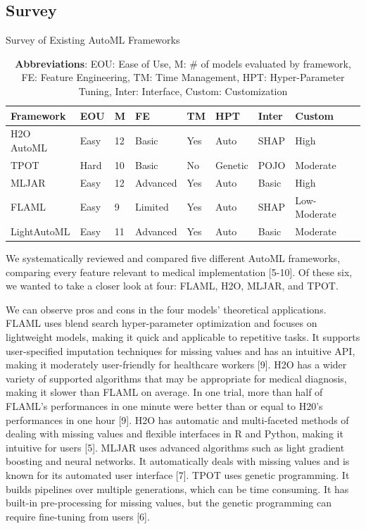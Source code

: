 \documentclass{article}
\begin{document}
\subsection{Survey}

\begin{table}
  \caption{Survey of Existing AutoML Frameworks}
  \label{automl-survey}
  \centering
  \begin{tabular}{lllllllll}
    \toprule
    Framework & EOU & M & FE & TM & HPT & Inter & Custom\\
    \midrule
    H2O AutoML & Easy & 12 & Basic & Yes & Auto & SHAP & High\\
    TPOT & Hard & 10 & Basic & No & Genetic & POJO & Moderate\\
    MLJAR & Easy & 12 & Advanced & Yes & Auto & Basic & High\\
    FLAML & Easy & 9 & Limited & Yes & Auto & SHAP & Low-Moderate\\
    LightAutoML & Easy & 11 & Advanced & Yes & Auto & Basic & Moderate\\
    \bottomrule
  \end{tabular}
  \captionsetup{font=footnotesize}
  \caption*{\textbf{Abbreviations}: EOU: Ease of Use, M: \# of models evaluated by framework, FE: Feature Engineering, TM: Time Management, HPT: Hyper-Parameter Tuning, Inter: Interface, Custom: Customization}
\end{table}
We systematically reviewed and compared five different AutoML frameworks, comparing every feature relevant to medical implementation [5-10]. Of these six, we wanted to take a closer look at four: FLAML, H2O, MLJAR, and TPOT.

We can observe pros and cons in the four models' theoretical applications. FLAML uses blend search hyper-parameter optimization and focuses on lightweight models, making it quick and applicable to repetitive tasks. It supports user-specified imputation techniques for missing values and has an intuitive API, making it moderately user-friendly for healthcare workers [9]. H2O has a wider variety of supported algorithms that may be appropriate for medical diagnosis, making it slower than FLAML on average. In one trial, more than half of FLAML's performances in one minute were better than or equal to H20's performances in one hour [9]. H2O has automatic and multi-faceted methods of dealing with missing values and flexible interfaces in R and Python, making it intuitive for users [5]. MLJAR uses advanced algorithms such as light gradient boosting and neural networks. It automatically deals with missing values and is known for its automated user interface [7]. TPOT uses genetic programming. It builds pipelines over multiple generations, which can be time consuming. It has built-in pre-processing for missing values, but the genetic programming can require fine-tuning from users [6].
\end{document}

